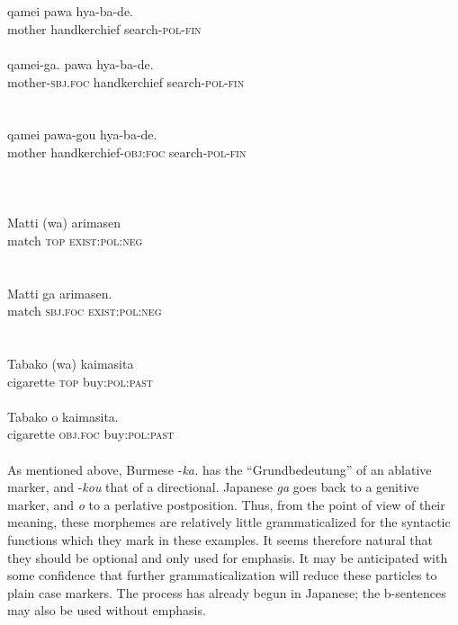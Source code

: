 \ea\label{ex:E101}
 \\
 \ea {}\\
 \gll  qamei  pawa  hya-ba-de.\\
  mother  handkerchief  search-\textsc{pol}-\textsc{fin}\\
\\
\ex
\gll  qamei-ga.  pawa  hya-ba-de.\\
 mother-\textsc{sbj}.\textsc{foc}  handkerchief search-\textsc{pol}-\textsc{fin}\\
\\
\ex {}\\
\gll qamei pawa-gou hya-ba-de.\\
mother handkerchief-\textsc{obj}:\textsc{foc}  search-\textsc{pol}-\textsc{fin}\\
\\
\z
\z
\noindent \ea\label{ex:E102}
\langinfo{\LangJap}{}{}  \\
 \ea {}\\
 \gll  Matti  (wa)  arimasen\\
 match  \textsc{top}  \textsc{exist}:\textsc{pol}:\textsc{neg}\\
\\
\ex {}\\
\gll  Matti  ga  arimasen.\\
 match  \textsc{sbj}.\textsc{foc} \textsc{exist}:\textsc{pol}:\textsc{neg}\\
\\
\z
\z
\noindent \ea\label{ex:E103}
\\
 \ea
 \gll  Tabako  (wa)  kaimasita\\
   cigarette  \textsc{top}  buy:\textsc{pol}:\textsc{past}\\
\\
\ex
\gll  Tabako  o  kaimasita.\\
  cigarette  \textsc{obj}.\textsc{foc}  buy:\textsc{pol}:\textsc{past}\\
\\
\z
\z
\noindent As mentioned above, Burmese -\textit{ka.} has the ``Grundbedeutung'' of an ablative marker, and -\textit{kou} that of a directional. Japanese \textit{ga} goes back to a genitive marker, and \textit{o} to a perlative postposition. Thus, from the point of view of their meaning, these morphemes are relatively little grammaticalized for the syntactic functions which they mark in these examples. It seems therefore natural that they should be optional and only used for emphasis. It may be anticipated with some confidence that further grammaticalization will reduce these particles to plain case markers. The process has already begun in Japanese; the b-sentences may also be used without emphasis.

